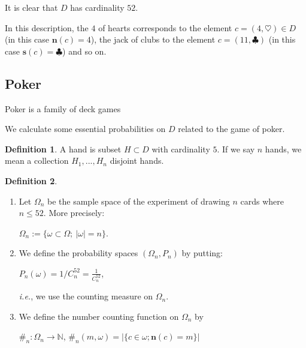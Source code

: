 \documentclass[]{article}
\theoremstyle{definition}
\newtheorem{definition}{Definition}[section]
\theoremstyle{definition}
\newcommand{\raw}{\rightarrow}
\newcommand{\ie}{\textit{i.e.}}
\newcommand{\bb}{\mathbb}
\begin{document}
It is clear that $D$ has cardinality $52$.

In this description, the $4$ of hearts corresponds to the element $c = (4, \heartsuit) \in D$ (in this case $\textbf{n}(c) = 4$), the jack of clubs to the element $c = (11, \clubsuit)$ (in this case $\textbf{s}(c) = \clubsuit$) and so on. 

\subsection{Poker}

Poker is a family of deck games

We calculate some essential probabilities on $D$ related to the game of poker. 

\begin{definition}
	A hand is subset $H \subset D$ with cardinality $5$. If we say $n$ hands, we mean a collection $H_1, ..., H_n$ disjoint hands.
\end{definition}


\begin{definition}
	
	\begin{enumerate}
		\item 	Let $\Omega_n$ be the sample space of the experiment of drawing $n$ cards where $n \leq 52$. More precisely:
		
		\begin{center}
			$\Omega_n := \{ \omega \subset \Omega; \ |\omega| = n \} $.
		\end{center}
	
		\item We define the probability spaces $(\Omega_n, P_n)$ by putting:
		
		\begin{center}
			$P_n(\omega ) = 1/C_{n}^{52} = \frac{1}{C_{n}^{52}}$, 
		\end{center}

		\ie, we use the counting measure on $\Omega_n$.

		\item We define the number counting function on $\Omega_n$ by
		
		\begin{center}
			$ \#_n: \Omega_n \raw \bb{N}$, $\#_n(m, \omega) = |\{ c \in \omega; \textbf{n}(c) = m \}|$
		\end{center}
		
	\end{enumerate}
	
	
\end{definition}
\end{document}
